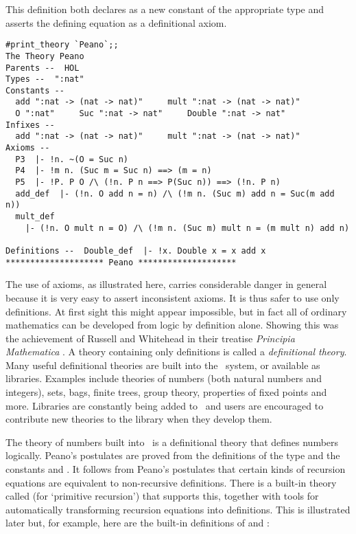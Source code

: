 \noindent This definition both declares  as a new constant of the
appropriate type and asserts the defining equation as a definitional axiom.

\begin{session}\begin{verbatim}
#print_theory `Peano`;;
The Theory Peano
Parents --  HOL
Types --  ":nat"
Constants --
  add ":nat -> (nat -> nat)"     mult ":nat -> (nat -> nat)"
  O ":nat"     Suc ":nat -> nat"     Double ":nat -> nat"
Infixes --
  add ":nat -> (nat -> nat)"     mult ":nat -> (nat -> nat)"
Axioms --
  P3  |- !n. ~(O = Suc n)
  P4  |- !m n. (Suc m = Suc n) ==> (m = n)
  P5  |- !P. P O /\ (!n. P n ==> P(Suc n)) ==> (!n. P n)
  add_def  |- (!n. O add n = n) /\ (!m n. (Suc m) add n = Suc(m add n))
  mult_def
    |- (!n. O mult n = O) /\ (!m n. (Suc m) mult n = (m mult n) add n)

Definitions --  Double_def  |- !x. Double x = x add x
******************** Peano ********************
\end{verbatim}\end{session}


The use of axioms, as illustrated here, carries considerable  danger in general
because it is very easy to assert inconsistent axioms.  It is thus safer to use
only definitions.  At first sight this might appear impossible, but in fact all
of ordinary  mathematics  can  be  developed  from  logic  by definition alone.
Showing this was  the achievement  of Russell  and Whitehead  in their treatise
{\sl Principia  Mathematica}  \cite{Principia}.    A   theory  containing  only
definitions is called a {\it definitional theory\/}.   Many useful definitional
theories are built into the \HOL\ system, or available as libraries.  Examples
include theories of numbers  (both natural  numbers and  integers), sets, bags,
finite trees, group theory, properties of fixed points and more.  Libraries are
constantly being  added  to \HOL\  and users  are encouraged  to contribute new
theories to the library when they develop them.

\newpage %

The theory of numbers built into \HOL\ is a definitional theory that defines
numbers logically. Peano's postulates are proved from the definitions of
the type  and the constants  and .
It follows from Peano's postulates that certain kinds of recursion equations are
equivalent to non-recursive definitions. There is a built-in theory called
 (for `primitive recursion') that supports this,
together with tools for automatically transforming recursion equations into
definitions. This is illustrated later but, for example, here are the built-in
definitions of \ml{+} and \ml{*}:

